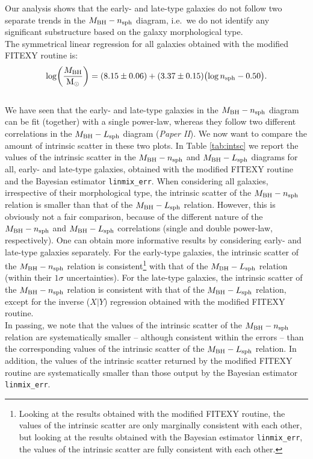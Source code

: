\documentclass[preprint2]{emulateapj}
\begin{document}
Our analysis shows that the early- and late-type galaxies do not follow two separate trends in the $M_{\rm BH} - n_{\rm sph}$ diagram, 
i.e.~we do not identify any significant substructure based on the galaxy morphological type. \\
The symmetrical linear regression for all galaxies obtained with the modified FITEXY routine is: 
\begin{equation*}
\log \biggl( \frac{M_{\rm BH}}{\rm M_\odot} \biggr) = (8.15 \pm 0.06) + (3.37 \pm 0.15) \bigl(\log n_{\rm sph} - 0.50 \bigr) . 
\end{equation*}
\\

We have seen that the early- and late-type galaxies in the $M_{\rm BH} - n_{\rm sph}$ diagram 
can be fit (together) with a single power-law, 
whereas they follow two different correlations in the $M_{\rm BH} - L_{\rm sph}$ diagram (\emph{Paper II}). 
We now want to compare the amount of intrinsic scatter in these two plots. 
In Table \ref{tab:intsc} we report the values of the intrinsic scatter 
in the $M_{\rm BH} - n_{\rm sph}$ and $M_{\rm BH} - L_{\rm sph}$ diagrams 
for all, early- and late-type galaxies, 
obtained with the modified FITEXY routine and the Bayesian estimator {\tt linmix\_err}. 
When considering all galaxies, irrespective of their morphological type, 
the intrinsic scatter of the $M_{\rm BH} - n_{\rm sph}$ relation is smaller than that of the $M_{\rm BH} - L_{\rm sph}$ relation. 
However, this is obviously not a fair comparison, 
because of the different nature of the $M_{\rm BH} - n_{\rm sph}$ and $M_{\rm BH} - L_{\rm sph}$ correlations 
(single and double power-law, respectively). 
One can obtain more informative results by considering early- and late-type galaxies separately. 
For the early-type galaxies, the intrinsic scatter of the $M_{\rm BH} - n_{\rm sph}$ relation is consistent\footnote{Looking 
at the results obtained with the modified FITEXY routine, 
the values of the intrinsic scatter are only marginally consistent with each other, 
but looking at the results obtained with the Bayesian estimator {\tt linmix\_err}, 
the values of the intrinsic scatter are fully consistent with each other. } 
with that of the $M_{\rm BH} - L_{\rm sph}$ relation (within their $1\sigma$ uncertainties). 
For the late-type galaxies, the intrinsic scatter of the $M_{\rm BH} - n_{\rm sph}$ relation is consistent with 
that of the $M_{\rm BH} - L_{\rm sph}$ relation, 
except for the inverse ($X|Y$) regression obtained with the modified FITEXY routine. \\
In passing, we note that the values of the intrinsic scatter of the $M_{\rm BH} - n_{\rm sph}$ relation 
are systematically smaller -- although consistent within the errors -- 
than the corresponding values of the intrinsic scatter of the $M_{\rm BH} - L_{\rm sph}$ relation.  
In addition, the values of the intrinsic scatter returned by the modified FITEXY routine are systematically smaller than 
those output by the Bayesian estimator {\tt linmix\_err}. 
\end{document}
